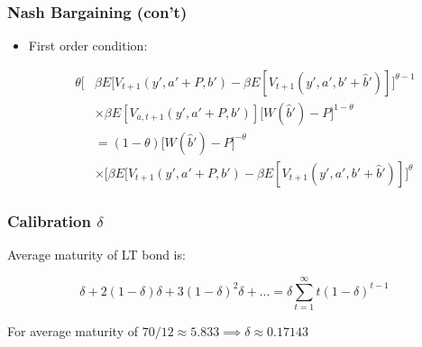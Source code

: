 \documentclass[handout]{beamer}
\begin{document}
\begin{frame}[label = nb_foc]
\frametitle{Nash Bargaining (con't)}

\begin{itemize}[<+->] 

\item First order condition:

\begin{align*}
\theta \Bigg[&\beta E[V_{t+1}(y', a' + P, b') - \beta E[V_{t+1}(y', a', b' + \hat{b}')]\Bigg]^{\theta-1} \\
&\times \beta E[V_{a,t+1}(y', a' + P, b')] \Bigg[ W(\hat{b}') - P\Bigg]^{1-\theta}\\
&= (1-\theta)\Bigg[ W(\hat{b}') - P\Bigg]^{-\theta}\\
&\times\Bigg[\beta E[V_{t+1}(y', a' + P, b') - \beta E[V_{t+1}(y', a', b' + \hat{b}')]\Bigg]^\theta
\end{align*}

\end{itemize}

\end{frame}





\begin{frame}[label = delta]
\frametitle{Calibration $\delta$}


Average maturity of LT bond is:

$$
\delta + 2(1-\delta)\delta + 3(1-\delta)^2 \delta + ... = \delta \sum_{t=1}^\infty  t (1-\delta)^{t-1}
$$

For average maturity of $70/12 \approx 5.833 \implies \delta \approx 0.17143$ 

\end{frame}
\end{document}
